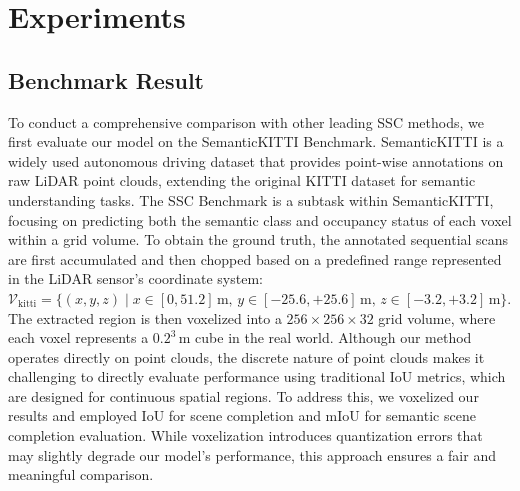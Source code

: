 \documentclass[conference]{IEEEtran}
\begin{document}
\section{Experiments}

\subsection{Benchmark Result}

To conduct a comprehensive comparison with other leading SSC methods, we first evaluate our model on the SemanticKITTI \cite{wwu} Benchmark.
SemanticKITTI is a widely used autonomous driving dataset that provides point-wise annotations on raw LiDAR point clouds, extending the original KITTI dataset for semantic understanding tasks.
The SSC Benchmark is a subtask within SemanticKITTI, focusing on predicting both the semantic class and occupancy status of each voxel within a grid volume.
To obtain the ground truth, the annotated sequential scans are first accumulated and then chopped based on a predefined range represented in the LiDAR sensor's coordinate system:
$\mathcal{V}_\mathrm{kitti} = \{(x,y,z) \mid x \in [0, 51.2]\,\text{m},\, y \in [-25.6, +25.6]\,\text{m},\, z \in [-3.2, +3.2]\,\text{m}\}$.
The extracted region is then voxelized into a $256 \times 256 \times 32$ grid volume, where each voxel represents a $0.2^3$\,m cube in the real world.
Although our method operates directly on point clouds, the discrete nature of point clouds makes it challenging to directly evaluate performance using traditional IoU metrics, which are designed for continuous spatial regions.
To address this, we voxelized our results and employed IoU for scene completion and mIoU for semantic scene completion evaluation.
While voxelization introduces quantization errors that may slightly degrade our model's performance, this approach ensures a fair and meaningful comparison.
\end{document}
